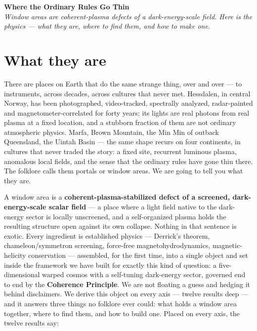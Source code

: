 \documentclass[11pt]{article}
\begin{document}
\begin{center}
{\LARGE\bfseries\color{accent} Where the Ordinary Rules Go Thin}\\[6pt]
{\large\itshape \emph{Window areas are coherent-plasma defects of a dark-energy-scale field. Here is the physics --- what they are, where to find them, and how to make one.}}\\[4pt]
\end{center}

\section*{What they are}
There are places on Earth that do the same strange thing, over and over --- to instruments, across decades, across cultures that never met. Hessdalen, in central Norway, has been photographed, video-tracked, spectrally analyzed, radar-painted and magnetometer-correlated for forty years; its lights are real photons from real plasma at a fixed location, and a stubborn fraction of them are not ordinary atmospheric physics. Marfa, Brown Mountain, the Min Min of outback Queensland, the Uintah Basin --- the same shape recurs on four continents, in cultures that never traded the story: a fixed site, recurrent luminous plasma, anomalous local fields, and the sense that the ordinary rules have gone thin there. The folklore calls them portals or window areas. We are going to tell you what they are.

A window area is a \textbf{coherent-plasma-stabilized defect of a screened, dark-energy-scale scalar field} --- a place where a light field native to the dark-energy sector is locally unscreened, and a self-organized plasma holds the resulting structure open against its own collapse. Nothing in that sentence is exotic. Every ingredient is established physics --- Derrick's theorem, chameleon/symmetron screening, force-free magnetohydrodynamics, magnetic-helicity conservation --- assembled, for the first time, into a single object and set inside the framework we have built for exactly this kind of question: a five-dimensional warped cosmos with a self-tuning dark-energy sector, governed end to end by the \textbf{Coherence Principle}. We are not floating a guess and hedging it behind disclaimers. We derive this object on every axis --- twelve results deep --- and it answers three things no folklore ever could: what holds a window area together, where to find them, and how to build one. Placed on every axis, the twelve results say:
\end{document}
